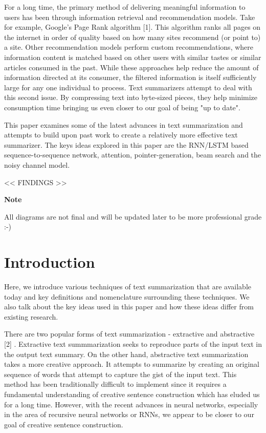 \documentclass[11pt]{article}
\begin{document}
For a long time, the primary method of delivering meaningful information
to users has been through information retrieval and recommendation
models. Take for example, Google's Page Rank algorithm {[}1{]}. This
algorithm ranks all pages on the internet in order of quality based on
how many sites recommend (or point to) a site. Other recommendation
models perform custom recommendations, where information content is
matched based on other users with similar tastes or similar articles
consumed in the past. While these approaches help reduce the amount of
information directed at its consumer, the filtered information is itself
sufficiently large for any one individual to process. Text summarizers
attempt to deal with this second issue. By compressing text into
byte-sized pieces, they help minimize consumption time bringing us even
closer to our goal of being "up to date".

This paper examines some of the latest advances in text summarization
and attempts to build upon past work to create a relatively more
effective text summarizer. The keys ideas explored in this paper are the
RNN/LSTM based sequence-to-sequence network, attention,
pointer-generation, beam search and the noisy channel model.

\textless{}\textless{} FINDINGS \textgreater{}\textgreater{}

\textbf{Note}

All diagrams are not final and will be updated later to be more
professional grade :-)

    \section{Introduction}\label{introduction}

Here, we introduce various techniques of text summarization that are
available today and key definitions and nomenclature surrounding these
techniques. We also talk about the key ideas used in this paper and how
these ideas differ from existing research.

There are two popular forms of text summarization - extractive and
abstractive {[}2{]} . Extractive text summmarization seeks to reproduce
parts of the input text in the output text summary. On the other hand,
abstractive text summarization takes a more creative approach. It
attempts to summarize by creating an original sequence of words that
attempt to capture the gist of the input text. This method has been
traditionally difficult to implement since it requires a fundamental
understanding of creative sentence construction which has eluded us for
a long time. However, with the recent advances in neural networks,
especially in the area of recursive neural networks or RNNs, we appear
to be closer to our goal of creative sentence construction.
\end{document}
